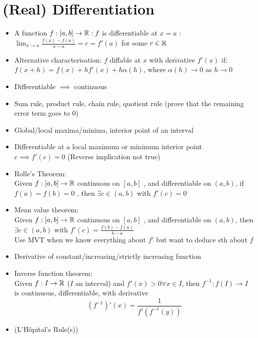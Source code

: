 \section{(Real) Differentiation}
\begin{itemize}
      \item A function $f: [a,b] \to \mathbb{R}: f $ is differentiable at $x = a$ :\\
            $\lim_{x\to a} \frac{f(x)-f(a)}{x-a} = c = f'(a)$ for some $c \in \mathbb{R}$
      \item Alternative characterisation: $f$ diffable at $x$ with derivative $f'(x)$ if:
            $ f(x+h) = f(x) + hf'(x) + h\alpha(h)$, where $\alpha(h) \to 0$ as $h \to 0$
      \item Differentiable $\implies$ continuous
      \item Sum rule, product rule, chain rule, quotient rule (prove that the remaining error term goes to $0$)
      \item Global/local maxima/minima, interior point of an interval
      \item Differentiable at a local maximum or minimum interior point $c \implies f'(c) = 0 $ (Reverse implication not true)
      \item Rolle's Theorem:  \\
            Given $ f: [a,b] \to \mathbb{R} $ continuous on $[a,b]$ , and differentiable on $ (a,b) $, if $f(a) = f(b) = 0$ , then  $\exists c \in (a,b)$  with $ f'(c) = 0$

      \item Mean value theorem: \\
            Given $ f: [a,b] \to \mathbb{R} $ continuous on $[a,b]$ , and differentiable on $ (a,b) $, then $\exists c \in (a,b)$ with $f'(c) = \frac{f(b)-f(a)}{b-a}$ \\

            Use MVT when we know everything about $f'$ but want to deduce sth about $f$

      \item Derivative of constant/increasing/strictly increasing function
      \item Inverse function theorem: \\
            Given $f : I \to \mathbb{R}$ ($I$ an interval) and $f'(x) >0 \forall x \in I$, then $f^{-1} : f(I) \to I$ is continuous, differentiable, with derivative \[ (f^{-1})' (x) = \frac{1}{f'(f^{-1}(y))}\]
      \item (L'H\^opital's Rule(s))

\end{itemize}

